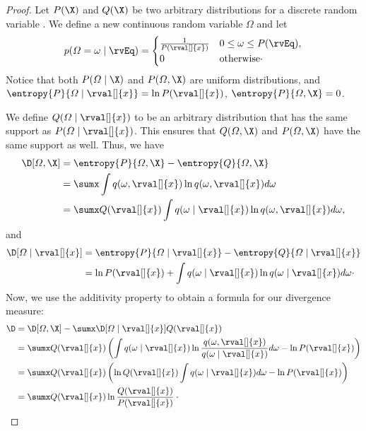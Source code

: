 \begin{proof}
    \newcommand{\T}{\varOmega}
    \renewcommand{\t}{\omega}
    \newcommand{\tIx}{\t \mid \rval[]{x}}
    \newcommand{\TIx}{\T \mid \rval[]{x}}
    \newcommand{\TX}{\T, \X}
    \newcommand{\tx}{\t, \rval[]{x}}
    \newcommand{\tent}[1]{\int q(#1) \ln q(#1) d\t}

    \newcommand{\Qx}{Q(\rval[]{x})}
    Let $P(\X)$ and $Q(\X)$ be two arbitrary distributions for a discrete random variable \X.
    We define a new continuous random variable $\T$ and let
    \begin{equation*}
        p(\T = \t \mid \rvEq) =
        \begin{cases}
            \frac{1}{P(\rval[]{x})} & 0 \leq \t \leq P(\rvEq),\\
            0 & \text{otherwise}\cdot
        \end{cases}
    \end{equation*}
    Notice that both $P(\T \mid \X)$ and $P(\TX)$ are uniform distributions, and
    $\entropy{P}{\TIx} = \ln P(\rval[]{x})$, $\entropy{P}{\TX} = 0$.

    We define $Q(\TIx)$ to be an arbitrary distribution that has the same support as $P(\TIx)$.
    This ensures that $Q(\TX)$ and $P(\TX)$ have the same support as well.
    Thus, we have
    \begin{align*}
        \D[\TX] &= \entropy{P}{\TX} - \entropy{Q}{\TX}\\
        &= \sumx \tent{\tx}\\
        &= \sumx \Qx \int q(\tIx) \ln q(\tx) d\t,
    \end{align*}
    and
    \begin{align*}
        \D[\TIx] &= \entropy{P}{\TIx} - \entropy{Q}{\TIx}\\
        &= \ln P(\rval[]{x}) + \tent{\tIx}\cdot
    \end{align*}
    Now, we use the additivity property to obtain a formula for our divergence measure:
    \begin{align*}
        \D &= \D[\TX] - \sumx \D[\TIx]\Qx \\
        &= \sumx \Qx  \left( \int q(\tIx) \ln \frac{q(\tx)}{q(\tIx)}d\t - \ln P(\rval[]{x}) \right)\\
        &= \sumx \Qx  \left( \ln \Qx \int q(\tIx) d\t - \ln P(\rval[]{x}) \right)\\
        &= \sumx \Qx \ln \frac{\Qx}{P(\rval[]{x})}\cdot \qedhere
    \end{align*}
\end{proof}

